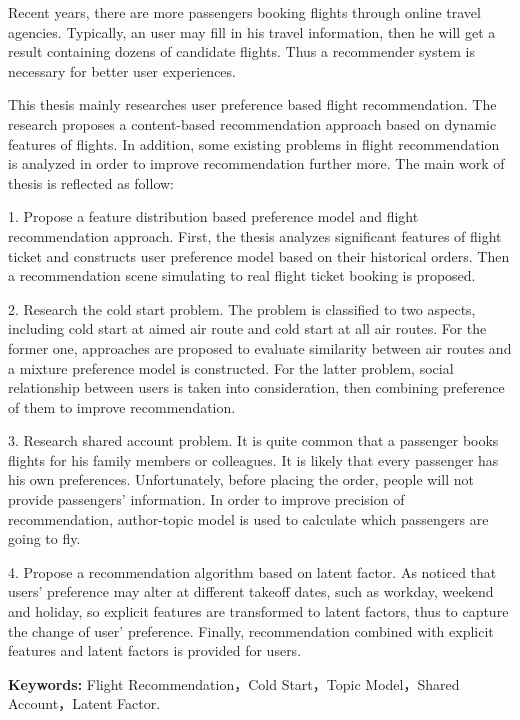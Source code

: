 \begin{englishabstract}
Recent years, there are more passengers booking flights through online travel agencies. Typically, an user may fill in his travel information, then he will get a result containing dozens of candidate flights. Thus a recommender system is necessary for better user experiences.

This thesis mainly researches user preference based flight recommendation. The research proposes a content-based recommendation approach based on dynamic features of flights. In addition, some existing problems in flight recommendation is analyzed in order to improve recommendation further more. The main work of thesis is reflected as follow:

1. Propose a feature distribution based preference model and flight recommendation approach. First, the thesis analyzes significant features of flight ticket and constructs user preference model based on their historical orders. Then a recommendation scene simulating to real flight ticket booking is proposed.

2. Research the cold start problem. The problem is classified to two aspects, including cold start at aimed air route and cold start at all air routes. For the former one, approaches are proposed to evaluate similarity between air routes and a mixture preference model is constructed. For the latter problem, social relationship between users is taken into consideration, then combining preference of them to improve recommendation.

3. Research shared account problem. It is quite common that a passenger books flights for his family members or colleagues. It is likely that every passenger has his own preferences. Unfortunately, before placing the order, people will not provide passengers' information. In order to improve precision of  recommendation, author-topic model is used to calculate which passengers are going to fly.

4. Propose a recommendation algorithm based on latent factor. As noticed that users' preference may alter at different takeoff dates, such as workday, weekend and holiday, so explicit features are transformed to latent factors, thus to capture the change of user' preference. Finally, recommendation combined with explicit features and latent factors is provided for users.


\textbf{Keywords:} Flight Recommendation，Cold Start，Topic Model，Shared Account，Latent Factor.
\end{englishabstract}

